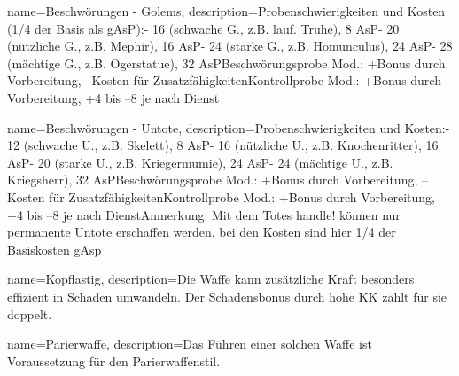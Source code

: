{
    name={Beschwörungen - Golems},
    description={Probenschwierigkeiten und Kosten (1/4 der Basis als gAsP):\newline - 16 (schwache G., z.B. lauf. Truhe), 8 AsP\newline - 20 (nützliche G., z.B. Mephir), 16 AsP\newline - 24 (starke G., z.B. Homunculus), 24 AsP\newline - 28 (mächtige G., z.B. Ogerstatue), 32 AsP\newline Beschwörungsprobe Mod.: +Bonus durch Vorbereitung, –Kosten für Zusatzfähigkeiten\newline Kontrollprobe Mod.: +Bonus durch Vorbereitung, +4 bis –8 je nach Dienst}
}


{
    name={Beschwörungen - Untote},
    description={Probenschwierigkeiten und Kosten:\newline - 12 (schwache U., z.B. Skelett), 8 AsP\newline - 16 (nützliche U., z.B. Knochenritter), 16 AsP\newline - 20 (starke U., z.B. Kriegermumie), 24 AsP\newline - 24 (mächtige U., z.B. Kriegsherr), 32 AsP\newline Beschwörungsprobe Mod.: +Bonus durch Vorbereitung, –Kosten für Zusatzfähigkeiten\newline Kontrollprobe Mod.: +Bonus durch Vorbereitung, +4 bis –8 je nach Dienst\newline Anmerkung: Mit dem Totes handle! können nur permanente Untote erschaffen werden, bei den Kosten sind hier 1/4 der Basiskosten gAsp}
}


{
    name={Kopflastig},
    description={Die Waffe kann zusätzliche Kraft besonders effizient in Schaden umwandeln. Der Schadensbonus durch hohe KK zählt für sie doppelt.}
}


{
    name={Parierwaffe},
    description={Das Führen einer solchen Waffe ist Voraussetzung für den Parierwaffenstil.}
}


